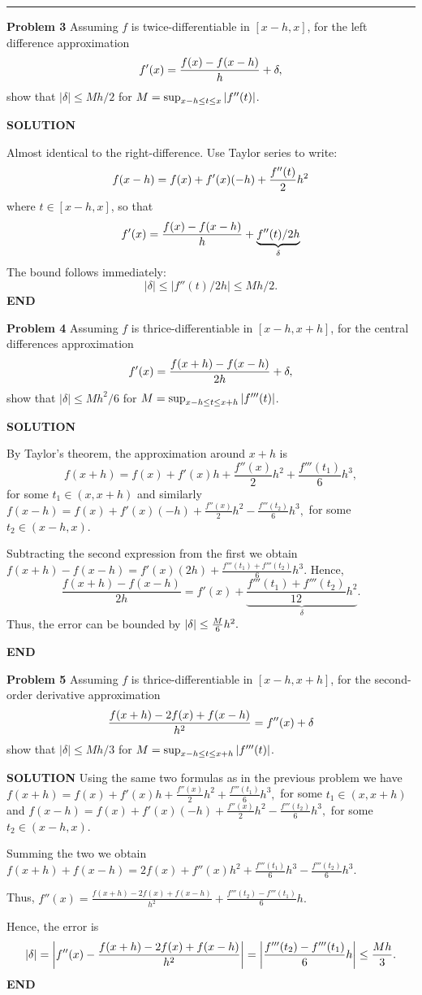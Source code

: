 \documentclass[12pt,a4paper]{article}
\begin{document}
\rule{\textwidth}{1pt}
\textbf{Problem 3} Assuming $f$ is twice-differentiable in $[x-h,x]$, for the left difference approximation
\[
f'(x) = {f(x) - f(x - h) \over h} + \ensuremath{\delta},
\]
show that $|\ensuremath{\delta}| \ensuremath{\leq} Mh/2$ for $M = \sup_{x-h \leq t \leq x}\left|{f''(t)}\right|$.

\textbf{SOLUTION}

Almost identical to the right-difference. Use Taylor series to write:
\[
f(x-h) = f(x) + f'(x) (-h) + {f''(t) \over 2} h^2
\]
where $t \ensuremath{\in} [x-h,x]$, so that
\[
f'(x) = {f(x) - f(x-h) \over h} + \underbrace{f''(t)/2 h}_\ensuremath{\delta}
\]
The bound follows immediately:
\[
|\ensuremath{\delta}| \ensuremath{\leq} |f''(t)/2 h| \ensuremath{\leq} Mh/2.
\]
\textbf{END}

\textbf{Problem 4} Assuming $f$ is thrice-differentiable in $[x-h,x+h]$, for the central differences approximation
\[
f'(x) = {f(x + h) - f(x - h) \over 2h} + \ensuremath{\delta},
\]
show that $|\ensuremath{\delta}| \ensuremath{\leq} Mh^2/6$ for $M = \sup_{x-h \leq t \leq x+h}\left|{f'''(t)}\right|$.

\textbf{SOLUTION}

By Taylor's theorem, the approximation around $x+h$ is
\[
f(x+h) = f(x) + f'(x)h + \frac{f''(x)}{2}h^2 + \frac{f'''(t_1)}{6}h^3,
\]
for some $t_1 \ensuremath{\in} (x, x+h)$ and similarly $f(x-h) = f(x) + f'(x)(-h) + \frac{f''(x)}{2}h^2 - \frac{f'''(t_2)}{6}h^3,$ for some $t_2 \ensuremath{\in} (x-h, x)$.

Subtracting the second expression from the first we obtain $f(x+h)-f(x-h) = f'(x)(2h) + \frac{f'''(t_1)+f'''(t_2)}{6}h^3.$ Hence,
\[
\frac{f(x+h)-f(x-h)}{2h} = f'(x)  + \underbrace{\frac{f'''(t_1)+f'''(t_2)}{12}h^2}_{\ensuremath{\delta}}.
\]
Thus, the error can be bounded by $\left|\ensuremath{\delta}\right| \ensuremath{\leq} {M \over 6} h^2.$

\textbf{END}

\textbf{Problem 5}  Assuming $f$ is thrice-differentiable in $[x-h,x+h]$, for the second-order derivative approximation
\[
{f(x+h) - 2f(x) + f(x-h) \over h^2} = f''(x) + \ensuremath{\delta}
\]
show that $|\ensuremath{\delta}| \ensuremath{\leq} Mh/3$ for $M = \sup_{x-h \leq t \leq x+h}\left|{f'''(t)}\right|$.

\textbf{SOLUTION} Using the same two formulas as in the previous problem we have $f(x+h) = f(x) + f'(x)h + \frac{f''(x)}{2}h^2 + \frac{f'''(t_1)}{6}h^3,$ for some $t_1 \ensuremath{\in} (x, x+h)$ and $f(x-h) = f(x) + f'(x)(-h) + \frac{f''(x)}{2}h^2 - \frac{f'''(t_2)}{6}h^3,$ for some $t_2 \ensuremath{\in} (x-h, x)$.

Summing the two we obtain $f(x+h) + f(x-h) = 2f(x) + f''(x)h^2 + \frac{f'''(t_1)}{6}h^3 - \frac{f'''(t_2)}{6}h^3.$

Thus, $f''(x) = \frac{f(x+h) - 2f(x) + f(x-h)}{h^2} + \frac{f'''(t_2) - f'''(t_1)}{6}h.$

Hence, the error is
\[
|\ensuremath{\delta}| = \left|f''(x) - {f(x+h) - 2f(x) + f(x-h) \over h^2} \right| = \left|\frac{f'''(t_2) - f'''(t_1)}{6}h\right|\ensuremath{\leq} {Mh \over 3}.
\]
\textbf{END}
\end{document}
